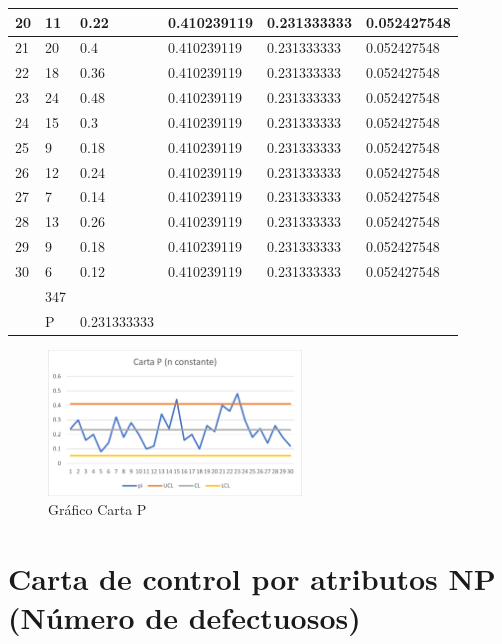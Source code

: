 \documentclass{article}
\theoremstyle{mytheoremstyle}
\theoremstyle{mytheoremstyle}
\theoremstyle{myproblemstyle}
\begin{document}
\begin{table}[ht!]
\begin{tabular}{|l|l|l|l|l|l|}
			20 & 11 & 0.22 & 0.410239119 & 0.231333333 & 0.052427548 \\ \hline
			21 & 20 & 0.4 & 0.410239119 & 0.231333333 & 0.052427548 \\ \hline
			22 & 18 & 0.36 & 0.410239119 & 0.231333333 & 0.052427548 \\ \hline
			23 & 24 & 0.48 & 0.410239119 & 0.231333333 & 0.052427548 \\ \hline
			24 & 15 & 0.3 & 0.410239119 & 0.231333333 & 0.052427548 \\ \hline
			25 & 9 & 0.18 & 0.410239119 & 0.231333333 & 0.052427548 \\ \hline
			26 & 12 & 0.24 & 0.410239119 & 0.231333333 & 0.052427548 \\ \hline
			27 & 7 & 0.14 & 0.410239119 & 0.231333333 & 0.052427548 \\ \hline
			28 & 13 & 0.26 & 0.410239119 & 0.231333333 & 0.052427548 \\ \hline
			29 & 9 & 0.18 & 0.410239119 & 0.231333333 & 0.052427548 \\ \hline
			30 & 6 & 0.12 & 0.410239119 & 0.231333333 & 0.052427548 \\ \hline
			~ & 347 & ~ & ~ & ~ & ~ \\ \hline
			~ & P & 0.231333333 \\ \hline
		\end{tabular}
	\end{table}
	\begin{figure}[ht!]
		\centering
		\includegraphics[width=0.6\textwidth]{GrafP.png}
		\caption[short]{Gráfico Carta P}
		\label{fig:imagen2}
	  \end{figure}
	  \newpage
\section{Carta de control por atributos NP (Número de defectuosos)}
\end{document}
